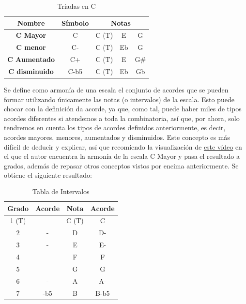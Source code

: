 \begin{table}[h]
    \centering
    \begin{tabular}{c|c|c|c|c}       
        \textbf{Nombre} & \textbf{Símbolo} & \multicolumn{3}{c}{\textbf{Notas}} \\
        \hline
        \hline
        \textbf{C Mayor} & C & C (T) & E & G \\
        \hline
        \textbf{C menor} & C- & C (T) & Eb & G \\
        \hline
        \textbf{C Aumentado} & C+ & C (T) & E & G\# \\
        \hline
        \textbf{C disminuido} & C-b5 & C (T) & Eb & Gb \\
    \end{tabular}
    \caption{Triadas en C}
    \label{tab:triadsC}
\end{table}

    \label{arm:armonia_escala}
    Se define como armonía de una escala el conjunto de acordes que se pueden formar utilizando únicamente las notas (o intervalos) de la escala. Esto puede chocar con la definición da acorde, ya que, como tal, puede haber miles de tipos acordes diferentes si atendemos a toda la combinatoria, así que, por ahora, solo tendremos en cuenta los tipos de acordes definidos anteriormente, es decir, acordes mayores, menores, aumentados y disminuidos. Este concepto es más difícil de deducir y explicar, así que recomiendo la visualización de \href{https://www.youtube.com/watch?v=dMwVB3BWcjI}{este vídeo} en el que el autor encuentra la armonía de la escala C Mayor y pasa el resultado a grados, además de repasar otros conceptos vistos por encima anteriormente. Se obtiene el siguiente resultado:

\begin{table}[h]
    \centering
    \begin{tabular}{c|c||c|c}
        \textbf{Grado} & \textbf{Acorde} & \textbf{Nota} & \textbf{Acorde} \\
        \hline
        1 (T) &  & C (T) & C \\
        2 & - & D & D- \\
        3 & - & E & E- \\
        4 &  & F & F \\
        5 &  & G & G \\
        6 & - & A & A- \\
        7 & -b5 & B & B-b5 \\
    \end{tabular}
    \caption{Tabla de Intervalos}
    \label{tab:tabla_intervalos}
\end{table}

